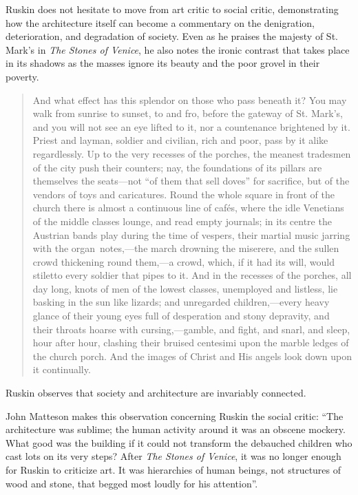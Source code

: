 Ruskin does not hesitate to move from art critic to social critic,
demonstrating how the architecture itself can become a commentary on
the denigration, deterioration, and degradation of society.  Even as he
praises the majesty of St. Mark's in \textit{The
Stones of Venice}, he also notes the ironic contrast that takes place
in its shadows as the masses ignore its beauty and the poor grovel in
their poverty.  

\begin{quote}
And what effect has this splendor on those who pass beneath it?  You may
walk from sunrise to sunset, to and fro, before the gateway of St.
Mark’s, and you will not see an eye lifted to it, nor a countenance
brightened by it.  Priest and layman, soldier and civilian, rich and
poor, pass by it alike regardlessly.  Up to the very recesses of the
porches, the meanest tradesmen of the city push their counters; nay,
the foundations of its pillars are themselves the seats—not “of them
that sell doves” for sacrifice, but of the vendors of toys and
caricatures.  Round the whole square in front of the church there is
almost a continuous line of cafés, where the idle Venetians of the
middle classes lounge, and read empty journals; in its centre the
Austrian bands play during the time of vespers, their martial music
jarring with the organ~notes,—the march drowning the miserere, and the
sullen crowd thickening round them,—a crowd, which, if it had its will,
would stiletto every soldier that pipes to it.  And in the recesses of
the porches, all day long, knots of men of the lowest classes,
unemployed and listless, lie basking in the sun like lizards; and
unregarded children,—every heavy glance of their young eyes full of
desperation and stony depravity, and their throats hoarse with
cursing,—gamble, and fight, and snarl, and sleep, hour after hour,
clashing their bruised centesimi upon the marble ledges of the church
porch.  And the images of Christ and His angels look down upon it
continually. \citep[][vol. 2, ch. 4, sec. 15]{ruskin1885}
\end{quote}

Ruskin observes that society and architecture are invariably connected.

John Matteson makes this observation concerning Ruskin the social
critic: ``The architecture was sublime; the human activity
around it was an obscene mockery.  What good was the building if it
could not transform the debauched children who cast lots on its very
steps?  After \textit{The Stones of Venice}, it was no longer enough
for Ruskin to criticize art.  It was hierarchies of human beings, not
structures of wood and stone, that begged most loudly for his
attention''\citep[][p.~302]{matteson2002}.

